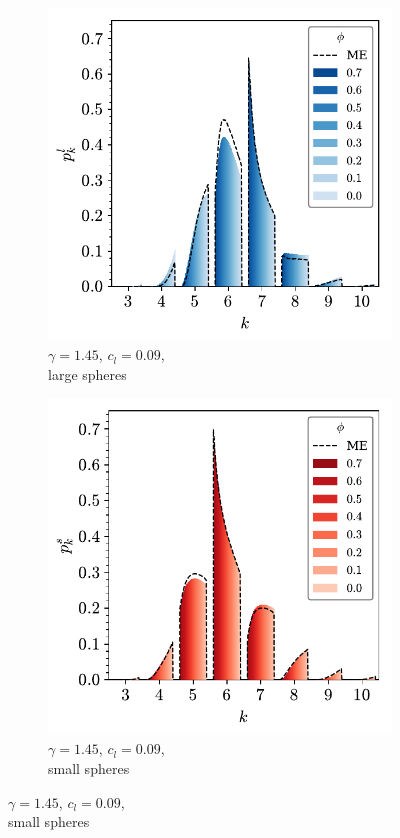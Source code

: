 \begin{figure}[bt]
      \begin{subfigure}[b]{0.48\textwidth}
         \centering
         \includegraphics[width=\textwidth]{./figures/quasi2d/phi_me_l_9.pdf}
         \caption{$\gamma=1.45$, $c_l=0.09$, \\large spheres}
         \label{fig:bime3}
     \end{subfigure}
     \hfill
     \begin{subfigure}[b]{0.48\textwidth}
         \centering
         \includegraphics[width=\textwidth]{./figures/quasi2d/phi_me_s_9.pdf}
         \caption{$\gamma=1.45$, $c_l=0.09$, \\small spheres}
         \label{fig:bime4}
     \end{subfigure}
     \hfill
    

\end{figure}
